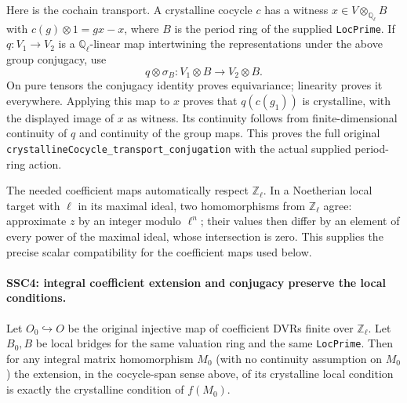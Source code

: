 Here is the cochain transport. A crystalline cocycle $c$ has a
witness $x\in V\otimes_{\mathbb Q_\ell}B$ with
$c(g)\otimes1=gx-x$, where $B$ is the period ring of the supplied
\texttt{LocPrime}. If $q:V_1\to V_2$ is a
$\mathbb Q_\ell$-linear map intertwining the representations
under the above group conjugacy, use
\[
 q\otimes\sigma_B:V_1\otimes B\longrightarrow V_2\otimes B.
\]
On pure tensors the conjugacy identity proves equivariance;
linearity proves it everywhere. Applying this map to $x$ proves
that $q(c(g_1))$ is crystalline, with the displayed image of $x$
as witness. Its continuity follows from finite-dimensional
continuity of $q$ and continuity of the group maps. This proves
the full original \texttt{crystallineCocycle\_transport\_conjugation}
with the actual supplied period-ring action.

The needed coefficient maps automatically respect
$\mathbb Z_\ell$. In a Noetherian local target with $\ell$ in its
maximal ideal, two homomorphisms from $\mathbb Z_\ell$ agree:
approximate $z$ by an integer modulo $\ell^n$; their values then
differ by an element of every power of the maximal ideal, whose
intersection is zero. This supplies the precise scalar compatibility
for the coefficient maps used below.

\paragraph{SSC4: integral coefficient extension and conjugacy preserve the local conditions.}
\label{claim:SSC4}
Let $O_0\hookrightarrow O$ be the original injective map of
coefficient DVRs finite over $\mathbb Z_\ell$. Let $B_0,B$ be
local bridges for the same valuation ring and the same
\texttt{LocPrime}. Then for any integral matrix homomorphism $M_0$
(with no continuity assumption on $M_0$)
the extension, in the cocycle-span sense above, of its crystalline
local condition is exactly the crystalline condition of $f(M_0)$.

